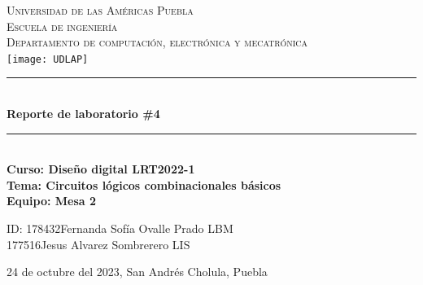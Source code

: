 \documentclass[12pt]{article}  %
\def\titulo{Reporte de laboratorio \#4}%
\def\materia{Curso: Diseño digital LRT2022-1} %
\def\fecha{24 de octubre del 2023} %
\def\equipo {Mesa 2}%
\def\ida{ID: 178432} %
\def\esta{Fernanda Sofía Ovalle Prado}
\def\lica{LBM}%
\def\idb{177516} %
\def\estb{Jesus Alvarez Sombrerero}
\def\licb{LIS}%
\def\topic{Circuitos lógicos combinacionales básicos}
\begin{document}
\begin{center}
    \newcommand{\HRule}{\rule{\linewidth}{0.5mm}}
    \thispagestyle{empty}
    \vspace*{-1.5cm}
    \textsc{\huge Universidad de las Américas Puebla}\\[1.5cm]
    \textsc{\LARGE Escuela de ingeniería}\\[1.5cm]
    \textsc{\LARGE Departamento de computación, electrónica y mecatrónica}\\[1.5cm]
    \texttt{[image: UDLAP]}  									\vspace*{1cm}														\HRule \\[0.4cm]
    { \huge \bfseries \titulo}\\[0.4cm]
    \HRule \\[1cm]
    { \Large \bfseries \materia}\\[1cm]
    { \Large \bfseries Tema: \topic}\\[1cm]
    { \Large \bfseries Equipo: \equipo}\\[1cm]
    \begin{flushleft} \Large
        \ida \hspace{0.5cm}\esta \hspace{0.5cm} \lica\\
        \idb \hspace{0.5cm}\estb \hspace{0.5cm} \licb\\
    \end{flushleft}
    \vfill
    \begin{center}
        {\Large  \fecha, San Andrés Cholula, Puebla}
    \end{center}
\end{center}							 								\newpage
\end{document}
